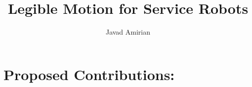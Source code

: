 \documentclass[11pt]{article}
\title{Legible Motion for Service Robots}
\author{Javad Amirian}
\begin{document}
    \maketitle






\section{Proposed Contributions:}
    \noindent
\end{document}
